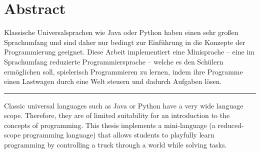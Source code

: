 \chapter*{Abstract}
\label{sec:abstract}

Klassische Universalsprachen wie Java oder Python haben einen sehr großen Sprachumfang und sind daher nur bedingt zur Einführung in die Konzepte der Programmierung geeignet. Diese Arbeit implementiert eine Minisprache – eine im Sprachumfang reduzierte Programmiersprache – welche es den Schülern ermöglichen soll, spielerisch Programmieren zu lernen, indem ihre Programme einen Lastwagen durch eine Welt steuern und dadurch Aufgaben lösen.

\rule{\textwidth}{1pt}

Classic universal languages such as Java or Python have a very wide language scope. Therefore, they are of limited suitability for an introduction to the concepts of programming. This thesis implements a mini-language (a reduced-scope programming language) that allows students to playfully learn programming by controlling a truck through a world while solving tasks.
